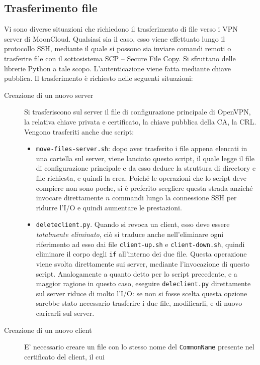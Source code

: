 \subsection{Trasferimento file}
Vi sono diverse situazioni che richiedono il trasferimento di file
verso i VPN server di MoonCloud. Qualsiasi sia il caso, esso viene effettuato
lungo il protocollo SSH, mediante il quale si possono sia inviare comandi remoti
o trasferire file con il sottosistema SCP -- Secure File Copy. Si sfruttano
delle librerie Python a tale scopo. L'autenticazione viene fatta mediante chiave
pubblica.
Il trasferimento è richiesto nelle seguenti situazioni:
\begin{description}
	\item[Creazione di un nuovo server]Si trasferiscono sul server il file
	di configurazione principale di OpenVPN, la relativa chiave privata e certificato,
	la chiave pubblica della CA, la CRL.
	Vengono trasferiti anche due script:
	\begin{itemize}
		\item \texttt{move-files-server.sh}: dopo aver trasferito i file appena elencati
		      in una cartella sul server, viene lanciato questo script, il quale legge il file
		      di configurazione principale e da esso deduce la struttura di directory e file
		      richiesta, e quindi la crea.
		      Poiché le operazioni che lo script deve compiere non sono poche, si è
		      preferito scegliere questa strada anziché invocare direttamente $n$ commandi 
		      lungo la connessione SSH per ridurre l'I/O e quindi aumentare le prestazioni.
		\item \texttt{deleteclient.py}. Quando si revoca un client, esso deve essere
		      \textit{totalmente eliminato}, ciò si traduce anche nell'eliminare ogni riferimento
		      ad esso dai file \texttt{client-up.sh} e \texttt{client-down.sh}, quindi eliminare
		      il corpo degli \texttt{if} all'interno dei due file. Questa operazione viene
		      svolta direttamente sui server, mediante l'invocazione di questo script.
		      Analogamente a quanto detto per lo script precedente, e a maggior ragione in questo
		      caso, eseguire \texttt{deleclient.py} direttamente sul server riduce di molto l'I/O:
		      se non si fosse scelta questa opzione sarebbe stato necessario trasferire i due file,
		      modificarli, e di nuovo caricarli sul server.
	\end{itemize}
	\item[Creazione di un nuovo client]E' necessario creare un file con lo stesso
	nome del \texttt{CommonName} presente nel certificato del client, il cui

\end{description}
